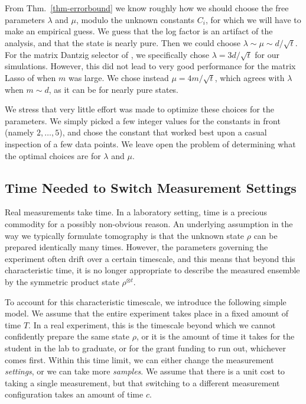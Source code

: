 From Thm.~\ref{thm-errorbound} we know roughly how we should choose the free parameters $\lambda$ and $\mu$, modulo the unknown constants $C_i$, for which we will have to make an empirical guess. We guess that the log factor is an artifact of the analysis, and that the state is nearly pure. Then we could choose $\lambda \sim \mu \sim d/\sqrt{t}$. For the matrix Dantzig selector of , we specifically  chose $\lambda = 
3 d/\sqrt{t}$ for our simulations. However, this did not lead to very good performance for the matrix Lasso of  when $m$ was large. We chose instead $\mu = 4 m/\sqrt{t}$, which agrees with $\lambda$ when $m \sim d$, as it can be for nearly pure states. 

We stress that very little effort was made to optimize these choices for the parameters. We simply picked a few integer values for the constants in front (namely $2,\dots,5$), and chose the constant that worked best upon a casual inspection of a few data points. We leave open the problem of determining what the optimal choices are for $\lambda$ and $\mu$. 


\subsection{Time Needed to Switch Measurement Settings}


Real measurements take time. In a laboratory setting, time is a precious commodity for a possibly non-obvious reason. An underlying assumption in the way we typically formulate tomography is that the unknown state $\rho$ can be prepared identically many times. However, the parameters governing the experiment often drift over a certain timescale, and this means that beyond this characteristic time, it is no longer appropriate to describe the measured ensemble by the symmetric product state $\rho^{\otimes t}$.  

To account for this characteristic timescale, we introduce the following simple model.  We assume that the entire experiment takes place in a fixed amount of time $T$.  In a real experiment, this is the timescale beyond which we cannot confidently prepare the same state $\rho$, or it is the amount of time it takes for the student in the lab to graduate, or for the grant funding to run out, whichever comes first.  Within this time limit, we can either change the measurement \emph{settings}, or we can take more \emph{samples}.  We assume that there is a unit cost to taking a single measurement, but that switching to a different measurement configuration takes an amount of time $c$.

